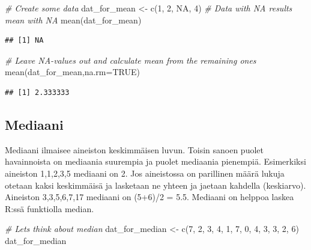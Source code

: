 \documentclass[
]{book}
\newenvironment{Shaded}{\begin{snugshade}}{\end{snugshade}}
\newcommand{\AttributeTok}[1]{\textcolor[rgb]{0.77,0.63,0.00}{#1}}
\newcommand{\CommentTok}[1]{\textcolor[rgb]{0.56,0.35,0.01}{\textit{#1}}}
\newcommand{\ConstantTok}[1]{\textcolor[rgb]{0.00,0.00,0.00}{#1}}
\newcommand{\DecValTok}[1]{\textcolor[rgb]{0.00,0.00,0.81}{#1}}
\newcommand{\FunctionTok}[1]{\textcolor[rgb]{0.00,0.00,0.00}{#1}}
\newcommand{\NormalTok}[1]{#1}
\newcommand{\OtherTok}[1]{\textcolor[rgb]{0.56,0.35,0.01}{#1}}
\begin{document}
\begin{Shaded}
\begin{Highlighting}[]
\CommentTok{\# Create some data}
\NormalTok{dat\_for\_mean }\OtherTok{\textless{}{-}} \FunctionTok{c}\NormalTok{(}\DecValTok{1}\NormalTok{, }\DecValTok{2}\NormalTok{, }\ConstantTok{NA}\NormalTok{, }\DecValTok{4}\NormalTok{)}
\CommentTok{\# Data with NA results mean with NA}
\FunctionTok{mean}\NormalTok{(dat\_for\_mean)}
\end{Highlighting}
\end{Shaded}

\begin{verbatim}
## [1] NA
\end{verbatim}

\begin{Shaded}
\begin{Highlighting}[]
\CommentTok{\# Leave NA{-}values out and calculate mean from the remaining ones}
\FunctionTok{mean}\NormalTok{(dat\_for\_mean,}\AttributeTok{na.rm=}\ConstantTok{TRUE}\NormalTok{)}
\end{Highlighting}
\end{Shaded}

\begin{verbatim}
## [1] 2.333333
\end{verbatim}

\hypertarget{mediaani}{%
\subsection{Mediaani}\label{mediaani}}

Mediaani ilmaisee aineiston keskimmäisen luvun. Toisin sanoen puolet havainnoista on mediaania suurempia ja puolet mediaania pienempiä. Esimerkiksi aineiston 1,1,2,3,5 mediaani on 2. Jos aineistossa on parillinen määrä lukuja otetaan kaksi keskimmäisä ja lasketaan ne yhteen ja jaetaan kahdella (keskiarvo). Aineiston 3,3,5,6,7,17 mediaani on (5+6)/2 = 5.5. Mediaani on helppoa laskea R:ssä funktiolla median.

\begin{Shaded}
\begin{Highlighting}[]
\CommentTok{\# Let\textquotesingle{}s think about median}
\NormalTok{dat\_for\_median }\OtherTok{\textless{}{-}} \FunctionTok{c}\NormalTok{(}\DecValTok{7}\NormalTok{, }\DecValTok{2}\NormalTok{, }\DecValTok{3}\NormalTok{, }\DecValTok{4}\NormalTok{, }\DecValTok{1}\NormalTok{, }\DecValTok{7}\NormalTok{, }\DecValTok{0}\NormalTok{, }\DecValTok{4}\NormalTok{, }\DecValTok{3}\NormalTok{, }\DecValTok{3}\NormalTok{, }\DecValTok{2}\NormalTok{, }\DecValTok{6}\NormalTok{)}
\NormalTok{dat\_for\_median}
\end{Highlighting}
\end{Shaded}
\end{document}
